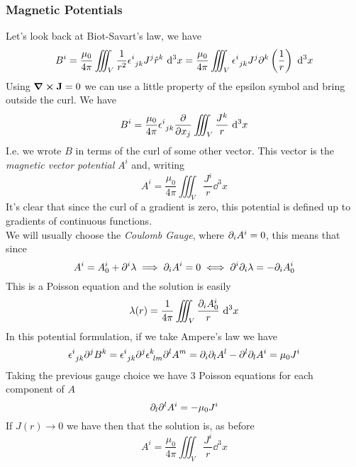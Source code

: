 \documentclass[../electromagnetism]{subfiles}
\begin{document}
\subsubsection{Magnetic Potentials}
Let's look back at Biot-Savart's law, we have
\begin{equation*}
	B^i=\frac{\mu_0}{4\pi}\iiint_V\frac{1}{r^2}\epsilon^{i}_{\ jk}J^j\hat{r}^k\ \mathrm{d}^3x=\frac{\mu_0}{4\pi}\iiint_V\epsilon^{i}_{\ jk}J^j\partial^k\left( \frac{1}{r} \right)\ \mathrm{d}^3x
\end{equation*}
Using $\curl\mathbf{J}=0$ we can use a little property of the epsilon symbol and bring outside the curl. We have
\begin{equation}
	B^i=\frac{\mu_0}{4\pi}\epsilon^{i}_{\ jk}\pdv{x_j}\iiint_V\frac{J^k}{r}\ \mathrm{d}^3x
	\label{eq:bcurl}
\end{equation}
I.e. we wrote $B$ in terms of the curl of some other vector. This vector is the \textit{magnetic vector potential} $A^i$ and, writing
\begin{equation}
	A^i=\frac{\mu_0}{4\pi}\iiint_V\frac{J^i}{r}\dd^3x
	\label{eq:mvpot}
\end{equation}
It's clear that since the curl of a gradient is zero, this potential is defined up to gradients of continuous functions.\\
We will usually choose the \textit{Coulomb Gauge}, where $\partial_iA^i=0$, this means that since
\begin{equation*}
	A^i=A^i_0+\partial^i\lambda\implies \partial_iA^i=0\iff\partial^i\partial_i\lambda=-\partial_iA^i_0
\end{equation*}
This is a Poisson equation and the solution is easily
\begin{equation*}
	\lambda(r)=\frac{1}{4\pi}\iiint_V\frac{\partial_iA^i_0}{r}\ \mathrm{d}^3x
\end{equation*}
In this potential formulation, if we take Ampere's law we have
\begin{equation}
	\epsilon^{i}_{\ jk}\partial^jB^k=\epsilon^{i}_{\ jk}\partial^j\epsilon^{k}_{\ lm}\partial^lA^m=\partial_i\partial_lA^l-\partial^l\partial_lA^i=\mu_0J^i
	\label{eq:amperepot}
\end{equation}
Taking the previous gauge choice we have 3 Poisson equations for each component of $A$
\begin{equation}
	\partial_l\partial^lA^i=-\mu_0J^i
	\label{eq:poissonB}
\end{equation}
If $J(r)\to0$ we have then that the solution is, as before
\begin{equation*}
	A^i=\frac{\mu_0}{4\pi}\iiint_V\frac{J^i}{r}\dd^3x
\end{equation*}
\end{document}
